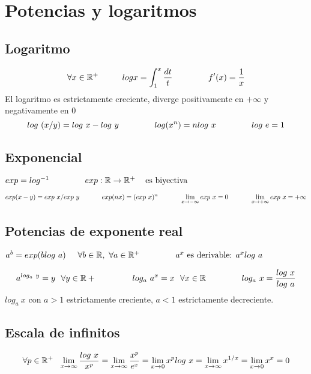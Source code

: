 \section{Potencias y logaritmos}
\subsection{Logaritmo}
$$ \forall x\in\mathbb{R}^+ \hspace{1cm}log x = \int_1^x \frac{dt}{t} \hspace{1.5cm}f'(x)=\frac{1}{x} $$
El logaritmo es estrictamente creciente, diverge positivamente en $+\infty$ y negativamente en $0$
$$ log \ (x/y) = log\ x-log\ y\hspace{1.5cm} log(x^n)=nlog\ x \hspace{1.5cm} log\ e=1$$

\subsection{Exponencial}
\begin{center}
$ exp = log^{-1} \hspace{1.5cm} exp:\mathbb{R}\rightarrow\mathbb{R}^+ \hspace{0.3cm} \text{ es biyectiva} $
\end{center}
$$ exp(x-y) = exp\ x/exp\ y \hspace{1.2cm} exp(nx) = (exp\ x)^n \hspace{1.2cm} \lim_{x\rightarrow -\infty} exp\ x = 0\hspace{1.2cm} \lim_{x\rightarrow +\infty} exp\ x= +\infty$$

\subsection{Potencias de exponente real}
\begin{center}
$ a^b = exp(blog\ a) \hspace{0.5cm} \forall b\in\mathbb{R}, \ \forall a\in\mathbb{R}^+ \hspace{1.5cm} a^x\text{ es derivable: }a^xlog \ a$
\end{center}
$$ a^{log_a\ y} = y \ \ \forall y\in\mathbb{R}+\hspace{1.5cm} log_a\ a^x = x\ \ \forall x\in\mathbb{R} \hspace{1.5cm} log_a\ x = \frac{log\ x}{log\ a}$$
$log_a \ x$ con $a>1$ estrictamente creciente, $a<1$ estrictamente decreciente.
\subsection{Escala de infinitos}
$$ \forall p\in\R^+ \ \ \limx \frac{log\ x}{x^p} = \limx \frac{x^p}{e^x} = \lim_{x\rightarrow 0} x^p log\ x = 
\limx x^{1/x} = \lim_{x\rightarrow0} x^x = 0 $$

